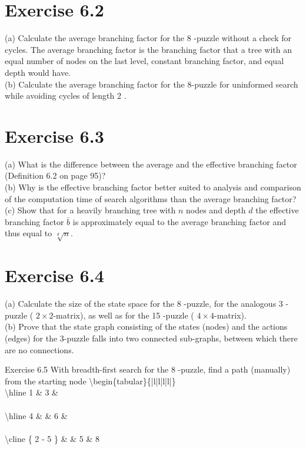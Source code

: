 \documentclass[10pt]{book}
\begin{document}
\section*{Exercise 6.2}
(a) Calculate the average branching factor for the 8 -puzzle without a check for cycles. The average branching factor is the branching factor that a tree with an equal number of nodes on the last level, constant branching factor, and equal depth would have.\\
(b) Calculate the average branching factor for the 8-puzzle for uninformed search while avoiding cycles of length 2 .

\section*{Exercise 6.3}
(a) What is the difference between the average and the effective branching factor (Definition 6.2 on page 95)?\\
(b) Why is the effective branching factor better suited to analysis and comparison of the computation time of search algorithms than the average branching factor?\\
(c) Show that for a heavily branching tree with $n$ nodes and depth $d$ the effective branching factor $\bar{b}$ is approximately equal to the average branching factor and thus equal to $\sqrt[d]{n}$.

\section*{Exercise 6.4}
(a) Calculate the size of the state space for the 8 -puzzle, for the analogous 3 -puzzle ( $2 \times 2$-matrix), as well as for the 15 -puzzle ( $4 \times 4$-matrix).\\
(b) Prove that the state graph consisting of the states (nodes) and the actions (edges) for the 3-puzzle falls into two connected sub-graphs, between which there are no connections.

Exercise 6.5 With breadth-first search for the 8 -puzzle, find a path (manually) from the starting node \textbackslash begin\{tabular\}\{|l|l|l|l|\}\\
\textbackslash hline 1 \& 3 \& \\
\\
\textbackslash hline 4 \& \& 6 \& \\
\\
\textbackslash cline \{ 2 - 5 \} \& \& 5 \& 8 \\
\end{document}
